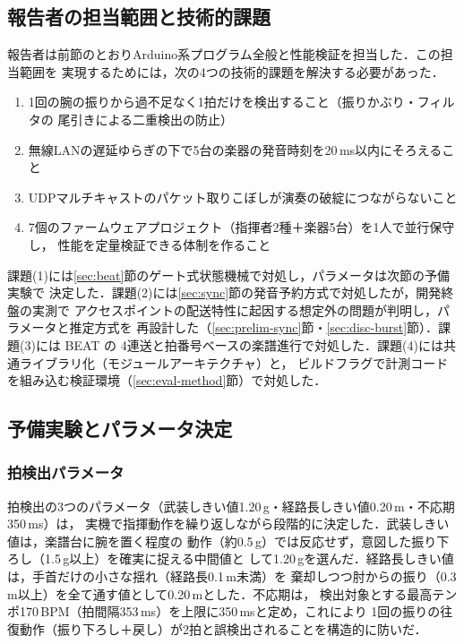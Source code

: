 \documentclass[uplatex,dvipdfmx]{jlreq}
\begin{document}
\subsection{報告者の担当範囲と技術的課題}\label{sec:tasks}

報告者は前節のとおりArduino系プログラム全般と性能検証を担当した．この担当範囲を
実現するためには，次の4つの技術的課題を解決する必要があった．

\begin{enumerate}
  \item 1回の腕の振りから過不足なく1拍だけを検出すること（振りかぶり・フィルタの
    尾引きによる二重検出の防止）
  \item 無線LANの遅延ゆらぎの下で5台の楽器の発音時刻を20\,ms以内にそろえること
  \item UDPマルチキャストのパケット取りこぼしが演奏の破綻につながらないこと
  \item 7個のファームウェアプロジェクト（指揮者2種＋楽器5台）を1人で並行保守し，
    性能を定量検証できる体制を作ること
\end{enumerate}

課題(1)には\ref{sec:beat}節のゲート式状態機械で対処し，パラメータは次節の予備実験で
決定した．課題(2)には\ref{sec:sync}節の発音予約方式で対処したが，開発終盤の実測で
アクセスポイントの配送特性に起因する想定外の問題が判明し，パラメータと推定方式を
再設計した（\ref{sec:prelim-sync}節・\ref{sec:disc-burst}節）．課題(3)には BEAT の
4連送と拍番号ベースの楽譜進行で対処した．課題(4)には共通ライブラリ化（モジュールアーキテクチャ）と，
ビルドフラグで計測コードを組み込む検証環境（\ref{sec:eval-method}節）で対処した．

\subsection{予備実験とパラメータ決定}\label{sec:prelim}

\subsubsection{拍検出パラメータ}\label{sec:prelim-beat}

拍検出の3つのパラメータ（武装しきい値1.20\,g・経路長しきい値0.20\,m・不応期350\,ms）は，
実機で指揮動作を繰り返しながら段階的に決定した．武装しきい値は，楽譜台に腕を置く程度の
動作（約0.5\,g）では反応せず，意図した振り下ろし（1.5\,g以上）を確実に捉える中間値と
して1.20\,gを選んだ．経路長しきい値は，手首だけの小さな揺れ（経路長0.1\,m未満）を
棄却しつつ肘からの振り（0.3\,m以上）を全て通す値として0.20\,mとした．不応期は，
検出対象とする最高テンポ170\,BPM（拍間隔353\,ms）を上限に350\,msと定め，これにより
1回の振りの往復動作（振り下ろし＋戻し）が2拍と誤検出されることを構造的に防いだ．
\end{document}
